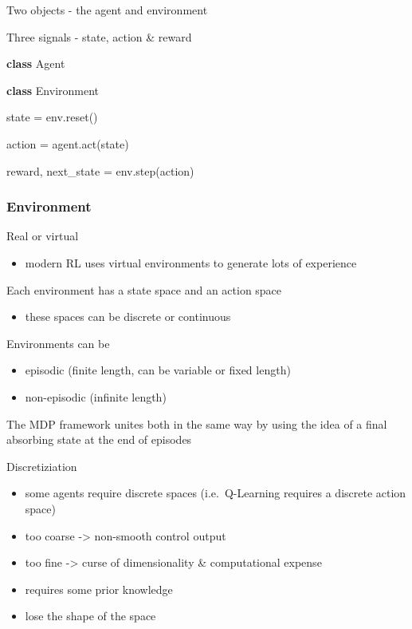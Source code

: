 \documentclass[]{article}
\newenvironment{Shaded}{}{}
\newcommand{\KeywordTok}[1]{\textcolor[rgb]{0.00,0.44,0.13}{\textbf{#1}}}
\newcommand{\NormalTok}[1]{#1}
\newcommand{\OperatorTok}[1]{\textcolor[rgb]{0.40,0.40,0.40}{#1}}
\providecommand{\tightlist}{%
  \setlength{\itemsep}{0pt}\setlength{\parskip}{0pt}}
\begin{document}
Two objects - the agent and environment

Three signals - state, action \& reward

\begin{Shaded}
\begin{Highlighting}[]
\KeywordTok{class}\NormalTok{ Agent}

\KeywordTok{class}\NormalTok{ Environment}

\NormalTok{state }\OperatorTok{=}\NormalTok{ env.reset()}

\NormalTok{action }\OperatorTok{=}\NormalTok{ agent.act(state)}

\NormalTok{reward, next_state }\OperatorTok{=}\NormalTok{ env.step(action)}
\end{Highlighting}
\end{Shaded}

\hypertarget{environment}{%
\subsubsection{Environment}\label{environment}}

Real or virtual

\begin{itemize}
\tightlist
\item
  modern RL uses virtual environments to generate lots of experience
\end{itemize}

Each environment has a state space and an action space

\begin{itemize}
\tightlist
\item
  these spaces can be discrete or continuous
\end{itemize}

Environments can be

\begin{itemize}
\tightlist
\item
  episodic (finite length, can be variable or fixed length)
\item
  non-episodic (infinite length)
\end{itemize}

The MDP framework unites both in the same way by using the idea of a
final absorbing state at the end of episodes

Discretiziation

\begin{itemize}
\tightlist
\item
  some agents require discrete spaces (i.e.~Q-Learning requires a
  discrete action space)
\item
  too coarse -\textgreater{} non-smooth control output
\item
  too fine -\textgreater{} curse of dimensionality \& computational
  expense
\item
  requires some prior knowledge
\item
  lose the shape of the space
\end{itemize}
\end{document}
